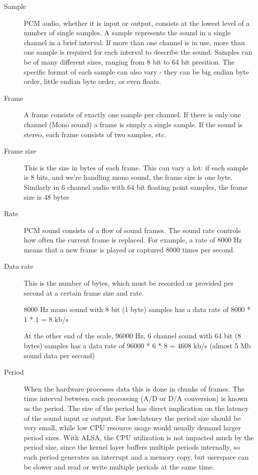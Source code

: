 \begin{description}
\item[Sample] PCM audio, whether it is input or output, consists at
  the lowest level of a number of single samples. A sample represents
  the sound in a single channel in a brief interval. If more than one
  channel is in use, more than one sample is required for each
  interval to describe the sound. Samples can be of many different
  sizes, ranging from 8 bit to 64 bit presition. The specific format
  of each sample can also vary - they can be big endian byte order,
  little endian byte order, or even floats.

\item[Frame] A frame consists of exactly one sample per channel. If
  there is only one channel (Mono sound) a frame is simply a single
  sample. If the sound is stereo, each frame consists of two samples,
  etc.

\item[Frame size] This is the size in bytes of each frame. This can
  vary a lot: if each sample is 8 bits, and we're handling mono sound,
  the frame size is one byte. Similarly in 6 channel audio with 64 bit
  floating point samples, the frame size is 48 bytes

\item[Rate] PCM sound consists of a flow of sound frames. The sound
  rate controls how often the current frame is replaced. For example,
  a rate of 8000 Hz means that a new frame is played or captured 8000
  times per second.

\item[Data rate] This is the number of bytes, which must be recorded
  or provided per second at a certain frame size and rate.

  8000 Hz mono sound with 8 bit (1 byte) samples has a data rate of
  8000 * 1 * 1 = 8 kb/s

  At the other end of the scale, 96000 Hz, 6 channel sound with 64 bit
  (8 bytes) samples has a data rate of 96000 * 6 * 8 = 4608 kb/s
  (almost 5 Mb sound data per second)

\item[Period] When the hardware processes data this is done in chunks
  of frames. The time interval between each processing (A/D or D/A
  conversion) is known as the period. The size of the period has
  direct implication on the latency of the sound input or output. For
  low-latency the period size should be very small, while low CPU
  resource usage would usually demand larger period sizes. With ALSA,
  the CPU utilization is not impacted much by the period size, since
  the kernel layer buffers multiple periods internally, so each period
  generates an interrupt and a memory copy, but userspace can be
  slower and read or write multiple periods at the same time.


\end{description}
